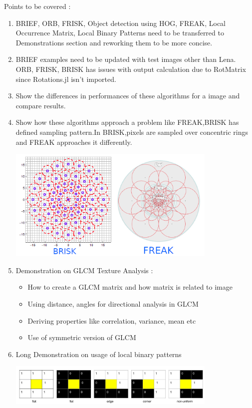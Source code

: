 \vspace{0.5cm}
Points to be covered :
\begin{enumerate}
    \item  BRIEF, ORB, FRISK, Object detection using HOG, FREAK, Local Occurrence Matrix, Local Binary Patterns need to be transferred to Demonstrations section and reworking them to be more concise.
    \item BRIEF examples need to be updated with test images other than Lena. ORB, FRISK, BRISK has issues with output calculation due to RotMatrix since Rotations.jl isn't imported.
    \item Show the differences in performances of these algorithms for a image and compare results.
    \item Show how these algorithms approach a problem like FREAK,BRISK has defined sampling pattern.In BRISK,pixels are sampled over concentric rings and FREAK approaches it differently.
    \begin{displayquote}
        \includegraphics[width=10cm,scale=0.5]{assets/image (1).png}
     \end{displayquote}
    \item Demonstration on GLCM Texture Analysis :
    \begin{itemize}
        \item How to create a GLCM matrix and how matrix is related to image
        \item Using distance, angles for directional analysis in GLCM
        \item Deriving properties like correlation, variance, mean etc
        \item Use of symmetric version of GLCM
    \end{itemize}
    
    \item Long Demonstration on usage of local binary patterns 
    \begin{displayquote}
    \includegraphics[width=10cm,scale=0.5]{assets/Untitled drawing (1).png}
    

\end{displayquote}
\end{enumerate}

